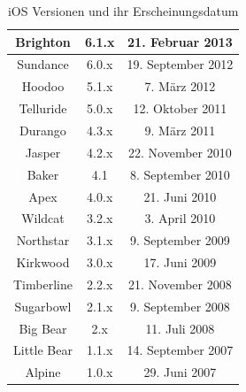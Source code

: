 \begin{table}[htbp]
{\begin{tabular}{|c|c|c|}
			Brighton                                 & 6.1.x                                   & 21. Februar 2013                                  \\ \hline
			Sundance                                 & 6.0.x                                   & 19. September 2012                                \\ \hline
			Hoodoo                                   & 5.1.x                                   & 7. März 2012                                      \\ \hline
			Telluride                                & 5.0.x                                   & 12. Oktober 2011                                  \\ \hline
			Durango                                  & 4.3.x                                   & 9. März 2011                                      \\ \hline
			Jasper                                   & 4.2.x                                   & 22. November 2010                                 \\ \hline
			Baker                                    & 4.1                                     & 8. September 2010                                 \\ \hline
			Apex                                     & 4.0.x                                   & 21. Juni 2010                                     \\ \hline
			Wildcat                                  & 3.2.x                                   & 3. April 2010                                     \\ \hline
			Northstar                                & 3.1.x                                   & 9. September 2009                                 \\ \hline
			Kirkwood                                 & 3.0.x                                   & 17. Juni 2009                                     \\ \hline
			Timberline                               & 2.2.x                                   & 21. November 2008                                 \\ \hline
			Sugarbowl                                & 2.1.x                                   & 9. September 2008                                 \\ \hline
			Big Bear                                 & 2.x                                     & 11. Juli 2008                                     \\ \hline
			Little Bear                              & 1.1.x                                   & 14. September 2007                                \\ \hline
			Alpine                                   & 1.0.x                                   & 29. Juni 2007                                     \\ \hline
		\end{tabular}
	}
\caption{iOS Versionen und ihr Erscheinungsdatum}\label{tab_ios_vers}\citep{ios_codenames}
\end{table}

